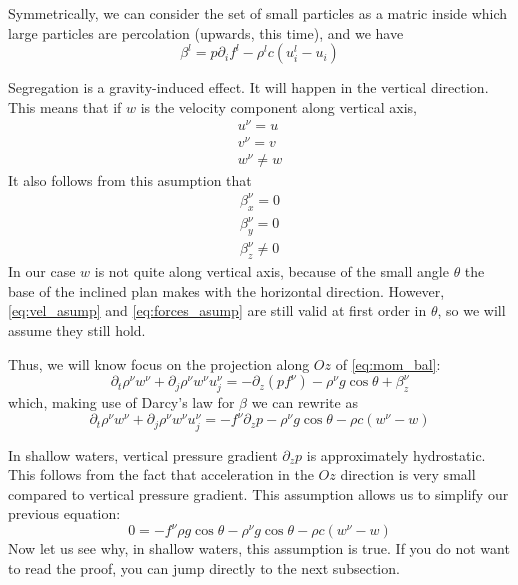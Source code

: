 Symmetrically, we can consider the set of small particles as a matric inside which large particles are percolation (upwards, this time), and we have
\begin{equation}
\beta^l = p \partial_i f^l - \rho^l c (u^l_i - u_i)
\end{equation}

Segregation is a gravity-induced effect. It will happen in the vertical direction. This means that if $w$ is the velocity component along vertical axis,
\begin{align} \label{eq:vel_asump}
u^\nu = u \\
v^\nu = v \\
w^\nu \neq w
\end{align}
It also follows from this asumption that 
\begin{align} \label{eq:forces_asump}
\beta^\nu_x = 0 \\
\beta^\nu_y = 0 \\
\beta^\nu_z \neq 0
\end{align}
In our case $w$ is not quite along vertical axis, because of the small angle $\theta$ the base of the inclined plan makes with the horizontal direction. 
However, \ref{eq:vel_asump} and \ref{eq:forces_asump} are still valid at first order in $\theta$, so we will assume they still hold.

Thus, we will know focus on the projection along $Oz$ of \ref{eq:mom_bal}:
\begin{equation} \label{eq:z_proj}
	\partial_t \rho^\nu w^\nu + \partial_j \rho^\nu w^\nu u_j^\nu = -\partial_z \left( p f^\nu \right) - \rho^\nu g \cos \theta + \beta^\nu_z 
\end{equation}
which, making use of Darcy's law for $\beta$ we can rewrite as
\begin{equation} 
	\partial_t \rho^\nu w^\nu + \partial_j \rho^\nu w^\nu u_j^\nu = -f^\nu \partial_z p  - \rho^\nu g \cos \theta - \rho c (w^\nu - w)
\end{equation}

In shallow waters, vertical pressure gradient $ \partial_z p $ is approximately hydrostatic. This follows from the fact that acceleration in the $Oz$ direction is very small compared to vertical pressure gradient. 
This assumption allows us to simplify our previous equation:
\begin{equation}
	0 = -f^\nu \rho g \cos \theta - \rho^\nu g \cos \theta - \rho c (w^\nu - w)
\end{equation}
Now let us see why, in shallow waters, this assumption is true. If you do not want to read the proof, you can jump directly to the next subsection.

